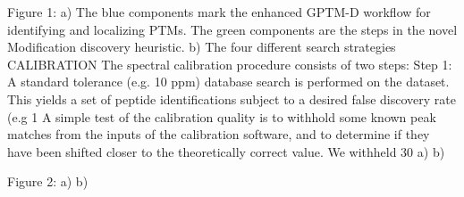 \documentclass[journal=jprobs,manuscript=article]{achemso}
\begin{document}
Figure 1: a) The blue components mark the enhanced GPTM-D workflow for identifying and localizing PTMs. The green components are the steps in the novel Modification discovery heuristic. b) The four different search strategies
CALIBRATION
The spectral calibration procedure consists of two steps: Step 1: A standard tolerance (e.g. 10 ppm) database search is performed on the dataset. This yields a set of peptide identifications subject to a desired false discovery rate (e.g 1%
A simple test of the calibration quality is to withhold some known peak matches from the inputs of the calibration software, and to determine if they have been shifted closer to the theoretically correct value. We withheld 30%
a)	b)
 	 
Figure 2: a) b) 
\end{document}
